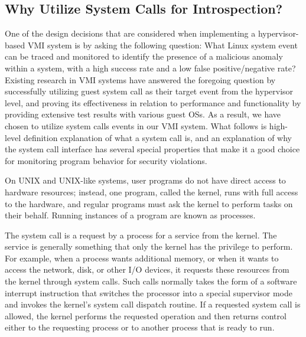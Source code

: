 \documentclass{report}
\begin{document}
\begin{spacing}{1.5}
\subsection{Why Utilize System Calls for Introspection?}
{\large
One of the design decisions that are considered when implementing a hypervisor-based VMI system is by asking the following question: What Linux system event can be traced and monitored to identify the presence of a malicious anomaly within a system, with a high success rate and a low false positive/negative rate? Existing research in VMI systems have answered the foregoing question by successfully utilizing guest system call as their target event from the hypervisor level, and proving its effectiveness in relation to performance and functionality by providing extensive test results with various guest OSs. As a result, we have chosen to utilize system calls events in our VMI system. What follows is high-level definition explanation of what a system call is, and an explanation of why the system call interface has several special properties that make it a good choice for monitoring program behavior for security violations.
\newline
}


{\large
On UNIX and UNIX-like systems, user programs do not have direct access to hardware resources; instead, one program, called the kernel, runs with full access to the hardware, and regular programs must ask the kernel to perform tasks on their behalf. Running instances of a program are known as processes.

The system call is a request by a process for a service from the kernel. The service is generally something that only the kernel has the privilege to perform. For example, when a process wants additional memory, or when it wants to access the network,
disk, or other I/O devices, it requests these resources from the kernel through system calls. Such calls normally takes the form of a software interrupt instruction that switches the processor into a special supervisor mode and invokes the kernel’s system call dispatch routine. If a requested system call is allowed, the kernel performs the requested operation and then returns control either to the requesting process or to another process that is ready to run.
\newline
}



\end{spacing}
\end{document}
